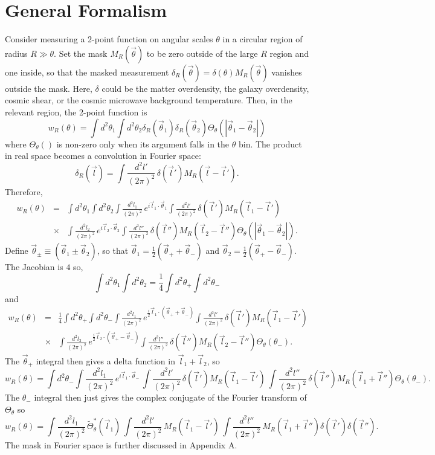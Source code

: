 \documentclass[prd,amsmath,amssymb,floatfix,superscriptaddress,nofootinbib]{revtex4-1}
\def\be{\begin{equation}}
\def\ee{\end{equation}}
\def\bea{\begin{eqnarray}}
\def\eea{\end{eqnarray}}
\newcommand{\vs}{\nonumber\\}
\begin{document}
\section{General Formalism}
Consider measuring a 2-point function on angular scales $\theta$ in a circular region of radius $R\gg\theta$. Set the mask $M_R(\vec\theta)$ to be zero outside of the large $R$ region and one inside, so that the masked measurement $\delta_R(\vec\theta) = \delta(\theta)M_R(\vec\theta)$ vanishes outside the mask. 
Here, $\delta$ could be the matter overdensity, the galaxy overdensity, cosmic shear, or the cosmic microwave background temperature.
Then, in the relevant region, the 2-point function is
\be
w_R(\theta)= \int d^2\theta_1 \int d^2\theta_2 \delta_R(\vec\theta_1) \delta_R(\vec\theta_2) \Theta_\theta(|\vec\theta_1-\vec\theta_2|)
\ee
where $\Theta_\theta()$ is non-zero only when its argument falls in the $\theta$ bin.
The product in real space becomes a convolution in Fourier space:
\be
\delta_R(\vec l) = \int \frac{d^2l'}{(2\pi)^2}\, \delta(\vec l') M_R(\vec l-\vec l') 
.\ee
Therefore,
\bea
w_R(\theta) &=& \int d^2\theta_1 \int d^2\theta_2 \int \frac{d^2l_1}{(2\pi)^2}\, e^{i\vec l_1\cdot \vec\theta_1}\int \frac{d^2l'}{(2\pi)^2}\, \delta(\vec l') M_R(\vec l_1-\vec l') 
\vs
&\times&
\int \frac{d^2l_2}{(2\pi)^2}\, e^{i\vec l_2\cdot \vec\theta_2}\int \frac{d^2l''}{(2\pi)^2}\, \delta(\vec l'') M_R(\vec l_2-\vec l'') 
 \Theta_\theta(|\vec\theta_1-\vec\theta_2|).
\eea
Define $\vec\theta_\pm \equiv (\vec\theta_1\pm\vec\theta_2)$, so that $\vec\theta_1=\frac12(\vec\theta_++\vec\theta_-)$ and $\vec\theta_2=\frac12(\vec\theta_+-\vec\theta_-)$. The Jacobian is $4$ so,
\be
 \int d^2\theta_1 \int d^2\theta_2  =  \frac14\int d^2\theta_+ \int d^2\theta_- 
\ee
and
\bea
w_R(\theta) &=& \frac14\int d^2\theta_+ \int d^2\theta_- \int \frac{d^2l_1}{(2\pi)^2}\, e^{\frac{i}2\vec l_1\cdot (\vec\theta_++\vec\theta_-)}\int \frac{d^2l'}{(2\pi)^2}\, \delta(\vec l') M_R(\vec l_1-\vec l') 
\vs
&\times&
\int \frac{d^2l_2}{(2\pi)^2}\, e^{\frac{i}2\vec l_2\cdot (\vec\theta_+-\vec\theta_-)}\int \frac{d^2l''}{(2\pi)^2}\, \delta(\vec l'') M_R(\vec l_2-\vec l'') 
 \Theta_\theta(\theta_-).
\eea
The $\vec\theta_+$ integral then gives a delta function in $\vec l_1+\vec l_2$, so
\be
w_R(\theta) =  \int d^2\theta_- \int \frac{d^2l_1}{(2\pi)^2}\, e^{i\vec l_1\cdot\vec\theta_-}\, \int \frac{d^2l'}{(2\pi)^2}\, \delta(\vec l') M_R(\vec l_1-\vec l') 
\,\int \frac{d^2l''}{(2\pi)^2}\, \delta(\vec l'') M_R(\vec l_1+\vec l'') 
 \Theta_\theta(\theta_-).
\ee
The $\theta_-$ integral then just gives the complex conjugate of the Fourier transform of $\Theta_\theta$ so
\be
w_R(\theta) =  \int \frac{d^2l_1}{(2\pi)^2}\, \tilde \Theta_\theta^*(\vec l_1)\, \int \frac{d^2l'}{(2\pi)^2}\, M_R(\vec l_1-\vec l') 
\,\int \frac{d^2l''}{(2\pi)^2}\, M_R(\vec l_1+\vec l'') \delta(\vec l') \delta(\vec l'') 
.
\ee
The mask in Fourier space is further discussed in Appendix A.
\end{document}
